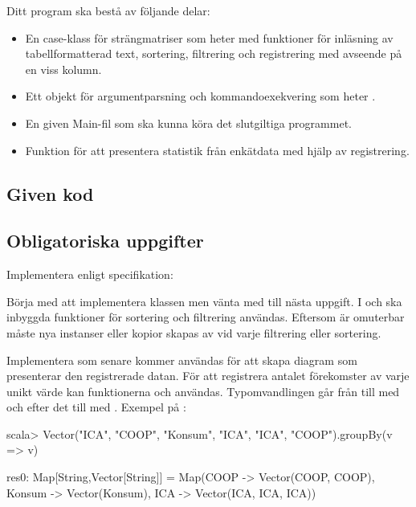 Ditt program ska bestå av följande delar:
\begin{itemize}
\item En case-klass för strängmatriser som heter  med funktioner för inläsning av tabellformatterad text, sortering, filtrering och registrering med avseende på en viss kolumn.
\item Ett objekt för argumentparsning och kommandoexekvering som heter .
\item En given Main-fil som ska kunna köra det slutgiltiga programmet.
\item Funktion för att presentera statistik från enkätdata med hjälp av registrering.
\end{itemize}

\subsection{Given kod}



\subsection{Obligatoriska uppgifter}

\Task Implementera  enligt specifikation:


\Subtask Börja med att implementera klassen  men vänta med  till nästa uppgift. I  och  ska inbyggda funktioner för sortering och filtrering användas. Eftersom  är omuterbar måste nya instanser eller kopior skapas av  vid varje filtrering eller sortering.

\Subtask Implementera  som senare kommer användas för att skapa diagram som presenterar den registrerade datan. För att registrera antalet förekomster av varje unikt värde kan funktionerna  och  användas. Typomvandlingen går från  till  med  och efter det till  med .
Exempel på :
\begin{REPLnonum}
scala> Vector("ICA", "COOP", "Konsum", "ICA", "ICA", "COOP").groupBy(v => v)

res0: Map[String,Vector[String]] = Map(COOP -> Vector(COOP, COOP),
                                       Konsum -> Vector(Konsum),
                                       ICA -> Vector(ICA, ICA, ICA))
\end{REPLnonum}

